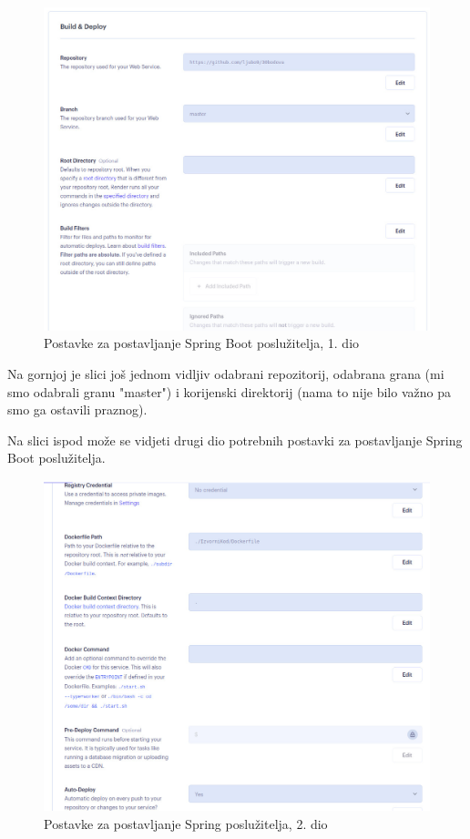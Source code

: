 		\begin{figure}[H]
			\includegraphics[scale=0.4]{slike/Render_BACKEND_1.JPG} %
			\centering
			\caption{Postavke za postavljanje Spring Boot poslužitelja, 1. dio}
			\label{Postavke za postavljanje Spring Boot poslužitelja, 1. dio}
		\end{figure}
		
		Na gornjoj je slici još jednom vidljiv odabrani repozitorij, odabrana grana (mi smo odabrali granu "master") i korijenski direktorij (nama to nije bilo važno pa smo ga ostavili praznog).
		
		Na slici ispod može se vidjeti drugi dio potrebnih postavki za postavljanje Spring Boot poslužitelja.
		
				\begin{figure}[H]
			\includegraphics[scale=0.4]{slike/Render_BACKEND_2.JPG} %
			\centering
			\caption{Postavke za postavljanje Spring poslužitelja, 2. dio}
			\label{Postavke za postavljanje Spring poslužitelja, 2. dio}
		\end{figure}
		
